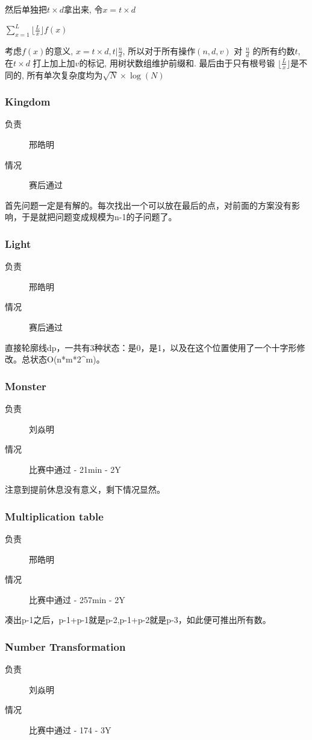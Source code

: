 \documentclass[a4paper, 11pt, nofonts, nocap, fancyhdr]{ctexart}
\newcommand{\problem}[1]{\subsubsection{#1}}
\begin{document}
然后单独把$t\times d$拿出来, 令$x = t\times d$

$\sum\limits_{x=1}^{L} \lfloor \frac{L}{x} \rfloor f(x)$

考虑$f(x)$的意义, $x=t\times d, t | \frac{n}{d}$, 所以对于所有操作$(n, d, v)$ 对 $\frac{n}{d}$ 的所有约数$t$, 在$t\times d$ 打上加上加$v$的标记, 用树状数组维护前缀和. 最后由于只有根号锻 $\lfloor\frac{L}{x}\rfloor$是不同的, 所有单次复杂度均为$\sqrt{N}\times \log(N)$

\problem{Kingdom}

\begin{description}
\item[负责] 邢皓明
\item[情况] 赛后通过
\end{description}

首先问题一定是有解的。每次找出一个可以放在最后的点，对前面的方案没有影响，于是就把问题变成规模为n-1的子问题了。

\problem{Light}

\begin{description}
\item[负责] 邢皓明
\item[情况] 赛后通过
\end{description}

直接轮廓线dp，一共有3种状态：是0，是1，以及在这个位置使用了一个十字形修改。总状态O(n*m*2^m)。

\problem{Monster}

\begin{description}
\item[负责] 刘焱明
\item[情况] 比赛中通过 - 21min - 2Y
\end{description}

注意到提前休息没有意义，剩下情况显然。

\problem{Multiplication table}

\begin{description}
\item[负责] 邢皓明
\item[情况] 比赛中通过 - 257min - 2Y
\end{description}

凑出p-1之后，p-1+p-1就是p-2,p-1+p-2就是p-3，如此便可推出所有数。

\problem{Number Transformation}

\begin{description}
\item[负责] 刘焱明
\item[情况] 比赛中通过 - 174 - 3Y
\end{description}
\end{document}
